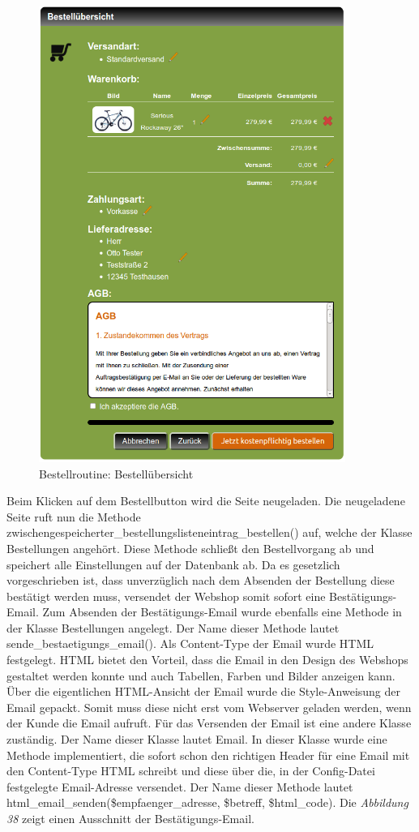 \begin{figure}[H]
	\begin{center}
			\includegraphics[width=100mm]{Bilder/bestelluebersicht.png}
	\end{center}
	\caption{Bestellroutine: Bestellübersicht}
\end{figure}

Beim Klicken auf dem  Bestellbutton wird die Seite neugeladen. Die neugeladene Seite ruft nun die Methode \glqq zwischengespeicherter\_bestellungslisteneintrag\_bestellen()\grqq{} auf, welche der Klasse \glqq Bestellungen\grqq{} angehört. Diese Methode schließt den Bestellvorgang ab und speichert alle Einstellungen auf der Datenbank ab. Da es gesetzlich vorgeschrieben ist, dass unverzüglich nach dem Absenden der Bestellung diese bestätigt werden muss, versendet der Webshop somit sofort eine Bestätigungs-Email. Zum Absenden der Bestätigungs-Email wurde ebenfalls eine Methode in der Klasse \glqq Bestellungen\grqq{} angelegt. Der Name dieser Methode lautet \glqq sende\_bestaetigungs\_email()\grqq{}. Als Content-Type der Email wurde HTML festgelegt. HTML bietet den Vorteil, dass die Email in den Design des Webshops gestaltet werden konnte und auch Tabellen, Farben und Bilder anzeigen kann. Über die eigentlichen HTML-Ansicht der Email wurde die Style-Anweisung der Email gepackt. Somit muss diese nicht erst vom Webserver geladen werden, wenn der Kunde die Email aufruft. Für das Versenden der Email ist eine andere Klasse zuständig. Der Name dieser Klasse lautet \glqq Email\grqq{}. In dieser Klasse wurde eine Methode implementiert, die sofort schon den richtigen Header für eine Email mit den Content-Type \glqq HTML\grqq{} schreibt und diese über die, in der \glqq Config-Datei\grqq{} festgelegte Email-Adresse versendet. Der Name dieser Methode lautet \glqq html\_email\_senden(\$empfaenger\_adresse, \$betreff, \$html\_code)\grqq{}. Die \textit{Abbildung 38} zeigt einen Ausschnitt der Bestätigungs-Email.

